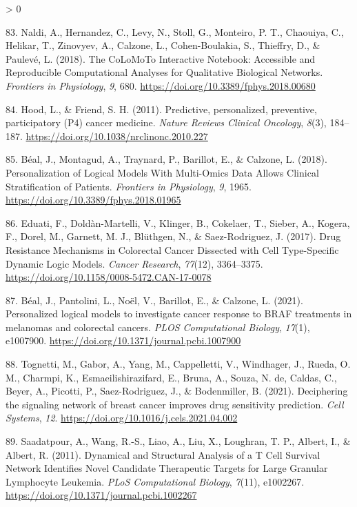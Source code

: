 \documentclass[
  12pt,
]{book}
\newlength{\cslhangindent}
\newenvironment{CSLReferences}[2] %
 {%
  \setlength{\parindent}{0pt}
  \ifodd #1 \everypar{\setlength{\hangindent}{\cslhangindent}}\ignorespaces\fi
  \ifnum #2 > 0
  \setlength{\parskip}{#2\baselineskip}
  \fi
 }%
 {}
\begin{document}
\begin{CSLReferences}{1}{0}
\leavevmode\hypertarget{ref-Naldi2018a}{}%
83. Naldi, A., Hernandez, C., Levy, N., Stoll, G., Monteiro, P. T., Chaouiya, C., Helikar, T., Zinovyev, A., Calzone, L., Cohen-Boulakia, S., Thieffry, D., \& Paulevé, L. (2018). {The CoLoMoTo Interactive Notebook: Accessible and Reproducible Computational Analyses for Qualitative Biological Networks}. \emph{Frontiers in Physiology}, \emph{9}, 680. \url{https://doi.org/10.3389/fphys.2018.00680}

\leavevmode\hypertarget{ref-Hood2011}{}%
84. Hood, L., \& Friend, S. H. (2011). {Predictive, personalized, preventive, participatory (P4) cancer medicine}. \emph{Nature Reviews Clinical Oncology}, \emph{8}(3), 184--187. \url{https://doi.org/10.1038/nrclinonc.2010.227}

\leavevmode\hypertarget{ref-Beal2018}{}%
85. Béal, J., Montagud, A., Traynard, P., Barillot, E., \& Calzone, L. (2018). {Personalization of Logical Models With Multi-Omics Data Allows Clinical Stratification of Patients}. \emph{Frontiers in Physiology}, \emph{9}, 1965. \url{https://doi.org/10.3389/fphys.2018.01965}

\leavevmode\hypertarget{ref-Eduati2017}{}%
86. Eduati, F., Doldàn-Martelli, V., Klinger, B., Cokelaer, T., Sieber, A., Kogera, F., Dorel, M., Garnett, M. J., Blüthgen, N., \& Saez-Rodriguez, J. (2017). {Drug Resistance Mechanisms in Colorectal Cancer Dissected with Cell Type-Specific Dynamic Logic Models.} \emph{Cancer Research}, \emph{77}(12), 3364--3375. \url{https://doi.org/10.1158/0008-5472.CAN-17-0078}

\leavevmode\hypertarget{ref-Beal2021}{}%
87. Béal, J., Pantolini, L., Noël, V., Barillot, E., \& Calzone, L. (2021). {Personalized logical models to investigate cancer response to BRAF treatments in melanomas and colorectal cancers}. \emph{PLOS Computational Biology}, \emph{17}(1), e1007900. \url{https://doi.org/10.1371/journal.pcbi.1007900}

\leavevmode\hypertarget{ref-Tognetti2021}{}%
88. Tognetti, M., Gabor, A., Yang, M., Cappelletti, V., Windhager, J., Rueda, O. M., Charmpi, K., Esmaeilishirazifard, E., Bruna, A., Souza, N. de, Caldas, C., Beyer, A., Picotti, P., Saez-Rodriguez, J., \& Bodenmiller, B. (2021). {Deciphering the signaling network of breast cancer improves drug sensitivity prediction}. \emph{Cell Systems}, \emph{12}. \url{https://doi.org/10.1016/j.cels.2021.04.002}

\leavevmode\hypertarget{ref-Saadatpour2011}{}%
89. Saadatpour, A., Wang, R.-S., Liao, A., Liu, X., Loughran, T. P., Albert, I., \& Albert, R. (2011). {Dynamical and Structural Analysis of a T Cell Survival Network Identifies Novel Candidate Therapeutic Targets for Large Granular Lymphocyte Leukemia}. \emph{PLoS Computational Biology}, \emph{7}(11), e1002267. \url{https://doi.org/10.1371/journal.pcbi.1002267}


\end{CSLReferences}
\end{document}
